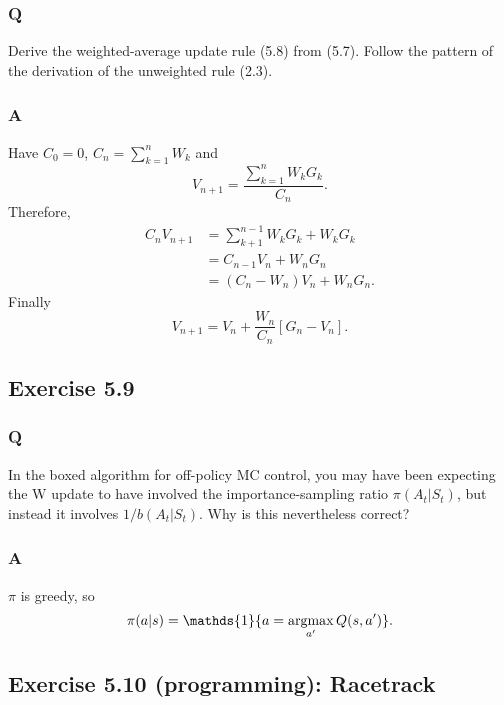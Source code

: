 \subsubsection{Q}
Derive the weighted-average update rule (5.8) from (5.7). Follow the pattern of the derivation of the unweighted rule (2.3).

\subsubsection{A}
Have $C_0 = 0$, $C_n = \sum_{k = 1}^n W_k$ and 
\[
    V_{n+1} = \frac{\sum_{k = 1}^n W_kG_k}{C_n}.
\]
Therefore,
\begin{align}
    C_n V_{n+1} &= \sum_{k+1}^{n-1}W_kG_k + W_kG_k\\
                &= C_{n-1}V_n + W_nG_n \\
                &= (C_n - W_n)V_n + W_nG_n.
\end{align}
Finally
\[
    V_{n+1} = V_n + \frac{W_n}{C_n}[G_n - V_n].
\]

\subsection{Exercise 5.9}
\subsubsection{Q}
In the boxed algorithm for off-policy MC control, you may have been expecting the W update to have involved the importance-sampling ratio $\pi(A_t|S_t)$, but instead it involves $1/b(A_t|S_t)$. Why is this nevertheless correct?

\subsubsection{A}
$\pi$ is greedy, so 
\[
    \pi(a | s) = \mathds{1}\{a = \argmax_{a'} Q(s, a')\}.
\]

\subsection{Exercise 5.10 (programming): Racetrack}
